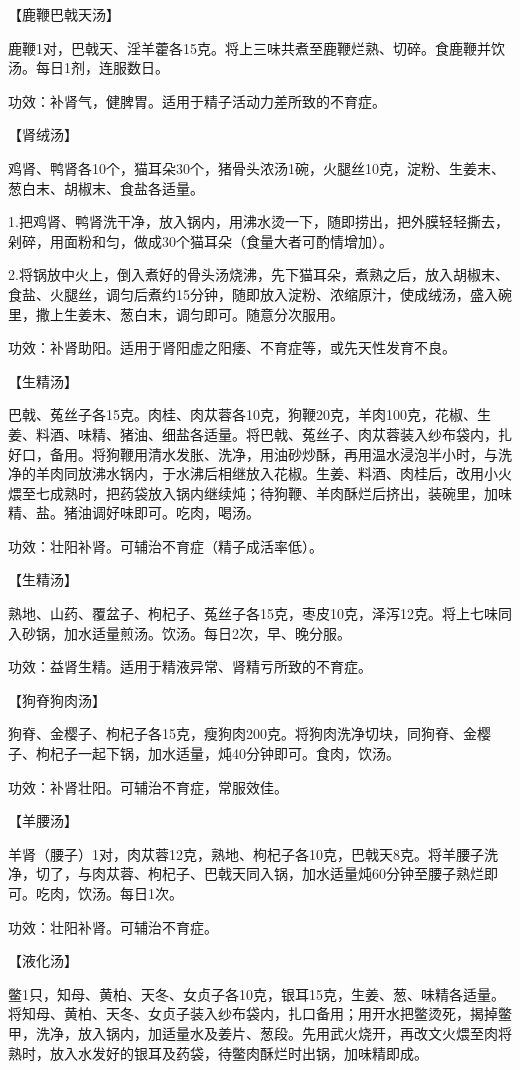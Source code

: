 \documentclass[12pt,UTF8,openany]{ctexbook}
\begin{document}
【鹿鞭巴戟天汤】

鹿鞭1对，巴戟天、淫羊藿各15克。将上三味共煮至鹿鞭烂熟、切碎。食鹿鞭并饮汤。每日1剂，连服数日。

功效：补肾气，健脾胃。适用于精子活动力差所致的不育症。

【肾绒汤】

鸡肾、鸭肾各10个，猫耳朵30个，猪骨头浓汤1碗，火腿丝10克，淀粉、生姜末、葱白末、胡椒末、食盐各适量。

1.把鸡肾、鸭肾洗干净，放入锅内，用沸水烫一下，随即捞出，把外膜轻轻撕去，剁碎，用面粉和匀，做成30个猫耳朵（食量大者可酌情增加）。

2.将锅放中火上，倒入煮好的骨头汤烧沸，先下猫耳朵，煮熟之后，放入胡椒末、食盐、火腿丝，调匀后煮约15分钟，随即放入淀粉、浓缩原汁，使成绒汤，盛入碗里，撒上生姜末、葱白末，调匀即可。随意分次服用。

功效：补肾助阳。适用于肾阳虚之阳痿、不育症等，或先天性发育不良。

【生精汤】

巴戟、菟丝子各15克。肉桂、肉苁蓉各10克，狗鞭20克，羊肉100克，花椒、生姜、料酒、味精、猪油、细盐各适量。将巴戟、菟丝子、肉苁蓉装入纱布袋内，扎好口，备用。将狗鞭用清水发胀、洗净，用油砂炒酥，再用温水浸泡半小时，与洗净的羊肉同放沸水锅内，于水沸后相继放入花椒。生姜、料酒、肉桂后，改用小火煨至七成熟时，把药袋放入锅内继续炖；待狗鞭、羊肉酥烂后挤出，装碗里，加味精、盐。猪油调好味即可。吃肉，喝汤。

功效：壮阳补肾。可辅治不育症（精子成活率低）。

【生精汤】

熟地、山药、覆盆子、枸杞子、菟丝子各15克，枣皮10克，泽泻12克。将上七味同入砂锅，加水适量煎汤。饮汤。每日2次，早、晚分服。

功效：益肾生精。适用于精液异常、肾精亏所致的不育症。

【狗脊狗肉汤】

狗脊、金樱子、枸杞子各15克，瘦狗肉200克。将狗肉洗净切块，同狗脊、金樱子、枸杞子一起下锅，加水适量，炖40分钟即可。食肉，饮汤。

功效：补肾壮阳。可辅治不育症，常服效佳。

【羊腰汤】

羊肾（腰子）1对，肉苁蓉12克，熟地、枸杞子各10克，巴戟天8克。将羊腰子洗净，切了，与肉苁蓉、枸杞子、巴戟天同入锅，加水适量炖60分钟至腰子熟烂即可。吃肉，饮汤。每日1次。

功效：壮阳补肾。可辅治不育症。

【液化汤】

鳖1只，知母、黄柏、天冬、女贞子各10克，银耳15克，生姜、葱、味精各适量。将知母、黄柏、天冬、女贞子装入纱布袋内，扎口备用；用开水把鳖烫死，揭掉鳖甲，洗净，放入锅内，加适量水及姜片、葱段。先用武火烧开，再改文火煨至肉将熟时，放入水发好的银耳及药袋，待鳖肉酥烂时出锅，加味精即成。
\end{document}
